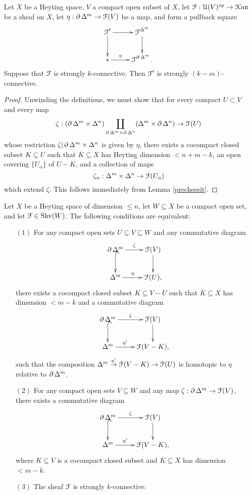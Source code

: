 \begin{lemma}\label{cheezit}
Let $X$ be a Heyting space, $V$ a compact open subset of $X$, let 
$\operatorname{\mathcal{F}}: \operatorname{\mathcal{U}}(V)^{op} \rightarrow \operatorname{\mathcal{K}an}$ be a sheaf on $X$, let
$\eta: \operatorname{\partial} \Delta^m \rightarrow \operatorname{\mathcal{F}}(V)$ be a map, and form a pullback square
$$ \xymatrix{ \calF' \ar[r] \ar[d] & \calF^{\Delta^m} \ar[d] \\
\ast \ar[r]^-{\eta} & \calF^{\bd \Delta^m}. }$$
Suppose that $\operatorname{\mathcal{F}}$ is strongly $k$-connective. Then $\operatorname{\mathcal{F}}'$ is strongly $(k-m)$-connective.
\end{lemma}

\begin{proof}
Unwinding the definitions, we must show that for every compact $U \subset V$ and every
map 
$$\zeta: ( \operatorname{\partial} \Delta^m \times \Delta^n ) \coprod_{ \operatorname{\partial} \Delta^m \times \operatorname{\partial} \Delta^n }
( \Delta^m \times \operatorname{\partial} \Delta^n ) \rightarrow \operatorname{\mathcal{F}}(U)$$
whose restriction $\zeta | \operatorname{\partial} \Delta^m \times \Delta^n$ is given by $\eta$, there
exists a cocompact closed subset $K \subseteq U$ such that $\overline{K} \subseteq X$ has Heyting dimension $< n+m -k$, an open covering $\{ U_{\alpha} \}$ of $U - K$, and a collection of maps
$$ \zeta_{\alpha}: \Delta^m \times \Delta^n \rightarrow \operatorname{\mathcal{F}}( U_{\alpha})$$ which extend $\zeta$. 
This follows immediately from Lemma \ref{precheesit}.
\end{proof}

\begin{theorem}\label{vanishing}
Let $X$ be a Heyting space of dimension $\leq n$, let $W \subseteq
X$ be a compact open set, and let $\operatorname{\mathcal{F}} \in \operatorname{Shv}(W)$. The
following conditions are equivalent:

\begin{itemize}

\item[$(1)$] For any compact open sets $U \subseteq V \subseteq W$
and any commutative diagram
$$ \xymatrix{ \bd \Delta^{m} \ar[r]^-{\zeta} \ar@{^{(}->}[d] & \calF(V) \ar[d] \\
\Delta^m \ar[r]^-{\eta} & \calF(U), }$$
there exists a cocompact closed subset $K \subseteq V-U$
such that $\overline{K} \subseteq X$ has dimension $< m-k$
and a commutative diagram
$$ \xymatrix{ \bd \Delta^{m} \ar[r]^-{\zeta} \ar@{^{(}->}[d] & \calF(V) \ar[d] \\
\Delta^m \ar[r]^-{\eta'} & \calF(V-K), }$$
such that the composition
$ \Delta^m \stackrel{\eta'}{\rightarrow} \operatorname{\mathcal{F}}(V-K) \rightarrow \operatorname{\mathcal{F}}(U)$
is homotopic to $\eta$ relative to $\operatorname{\partial} \Delta^m$.

\item[$(2)$] For any compact open sets $V \subseteq W$ and
any map $\zeta: \operatorname{\partial} \Delta^m \rightarrow \operatorname{\mathcal{F}}(V)$, there
exists a commutative diagram
$$ \xymatrix{ \bd \Delta^{m} \ar[r]^-{\zeta} \ar@{^{(}->}[d] & \calF(V) \ar[d] \\
\Delta^m \ar[r]^-{\eta'} & \calF(V-K), }$$
where $K \subseteq V$ is a cocompact closed subset
and $\overline{K} \subseteq X$ has dimension $< m-k$.

\item[$(3)$] The sheaf $\operatorname{\mathcal{F}}$ is strongly $k$-connective.
\end{itemize}
\end{theorem}

